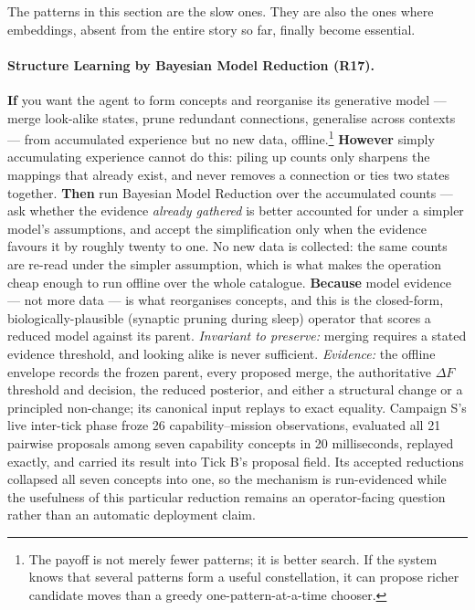 The patterns in this section are the slow ones.  They are also the ones where
embeddings, absent from the entire story so far, finally become essential.

\paragraph{Structure Learning by Bayesian Model Reduction (R17).} \textbf{If} you want the agent to form concepts and reorganise its generative model --- merge look-alike states, prune redundant connections, generalise across contexts --- from accumulated experience but no new data, offline.\footnote{The payoff is not merely fewer patterns; it is better search. If the system knows that several patterns form a useful constellation, it can propose richer candidate moves than a greedy one-pattern-at-a-time chooser.} \textbf{However} simply accumulating experience cannot do this: piling up counts only sharpens the mappings that already exist, and never removes a connection or ties two states together. \textbf{Then} run Bayesian Model Reduction over the accumulated counts --- ask whether the evidence \emph{already gathered} is better accounted for under a simpler model's assumptions, and accept the simplification only when the evidence favours it by roughly twenty to one.  No new data is collected: the same counts are re-read under the simpler assumption, which is what makes the operation cheap enough to run offline over the whole catalogue. \textbf{Because} model evidence --- not more data --- is what reorganises concepts, and this is the closed-form, biologically-plausible (synaptic pruning during sleep) operator that scores a reduced model against its parent.  \emph{Invariant to preserve:} merging requires a stated evidence threshold, and looking alike is never sufficient.  \emph{Evidence:} the offline envelope records the frozen parent, every proposed merge, the authoritative $\Delta F$ threshold and decision, the reduced posterior, and either a structural change or a principled non-change; its canonical input replays to exact equality.  Campaign S's live inter-tick phase froze 26 capability--mission observations, evaluated all 21 pairwise proposals among seven capability concepts in 20 milliseconds, replayed exactly, and carried its result into Tick B's proposal field.  Its accepted reductions collapsed all seven concepts into one, so the mechanism is run-evidenced while the usefulness of this particular reduction remains an operator-facing question rather than an automatic deployment claim.

